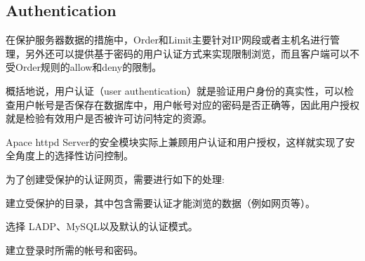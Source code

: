 \begin{lstlisting}[language=bash]

\end{lstlisting}





\begin{lstlisting}[language=bash]

\end{lstlisting}





\begin{lstlisting}[language=bash]

\end{lstlisting}






\begin{lstlisting}[language=bash]

\end{lstlisting}






\begin{lstlisting}[language=bash]

\end{lstlisting}




\subsection{Authentication}

在保护服务器数据的措施中，Order和Limit主要针对IP网段或者主机名进行管理，另外还可以提供基于密码的用户认证方式来实现限制浏览，而且客户端可以不受Order规则的allow和deny的限制。

概括地说，用户认证（user authentication）就是验证用户身份的真实性，可以检查用户帐号是否保存在数据库中，用户帐号对应的密码是否正确等，因此用户授权就是检验有效用户是否被许可访问特定的资源。

Apace httpd Server的安全模块实际上兼顾用户认证和用户授权，这样就实现了安全角度上的选择性访问控制。

为了创建受保护的认证网页，需要进行如下的处理:

\begin{compactitem}
\item 建立受保护的目录，其中包含需要认证才能浏览的数据（例如网页等）。
\item 选择 LADP、MySQL以及默认的认证模式。
\item 建立登录时所需的帐号和密码。
\end{compactitem}

